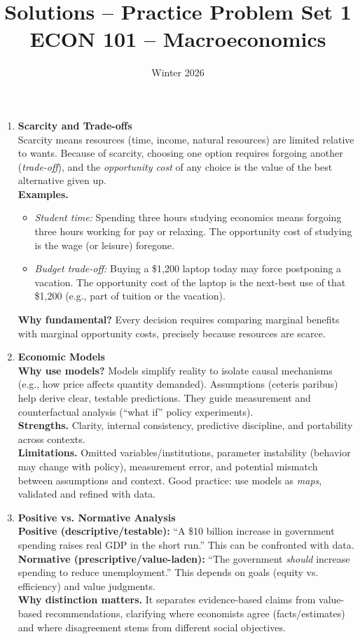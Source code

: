 \documentclass[12pt]{article}
\title{Solutions -- Practice Problem Set 1\\ \vspace{15pt} \large ECON 101 -- Macroeconomics}
\author{}
\date{Winter 2026}
\begin{document}
\maketitle


\begin{enumerate}
\item \textbf{Scarcity and Trade-offs} \\
Scarcity means resources (time, income, natural resources) are limited relative to wants. Because of scarcity, choosing one option requires forgoing another (\emph{trade-off}), and the \emph{opportunity cost} of any choice is the value of the best alternative given up. \\
\textbf{Examples.}
\begin{itemize}
  \item \emph{Student time:} Spending three hours studying economics means forgoing three hours working for pay or relaxing. The opportunity cost of studying is the wage (or leisure) foregone.
  \item \emph{Budget trade-off:} Buying a \$1{,}200 laptop today may force postponing a vacation. The opportunity cost of the laptop is the next-best use of that \$1{,}200 (e.g., part of tuition or the vacation).
\end{itemize}
\textbf{Why fundamental?} Every decision requires comparing marginal benefits with marginal opportunity costs, precisely because resources are scarce.

\item \textbf{Economic Models} \\
\textbf{Why use models?} Models simplify reality to isolate causal mechanisms (e.g., how price affects quantity demanded). Assumptions (ceteris paribus) help derive clear, testable predictions. They guide measurement and counterfactual analysis (``what if'' policy experiments). \\
\textbf{Strengths.} Clarity, internal consistency, predictive discipline, and portability across contexts. \\
\textbf{Limitations.} Omitted variables/institutions, parameter instability (behavior may change with policy), measurement error, and potential mismatch between assumptions and context. Good practice: use models as \emph{maps}, validated and refined with data.

\item \textbf{Positive vs. Normative Analysis} \\
\textbf{Positive (descriptive/testable):} ``A \$10 billion increase in government spending raises real GDP in the short run.'' This can be confronted with data. \\
\textbf{Normative (prescriptive/value-laden):} ``The government \emph{should} increase spending to reduce unemployment.'' This depends on goals (equity vs. efficiency) and value judgments. \\
\textbf{Why distinction matters.} It separates evidence-based claims from value-based recommendations, clarifying where economists agree (facts/estimates) and where disagreement stems from different social objectives.


\end{enumerate}
\end{document}
